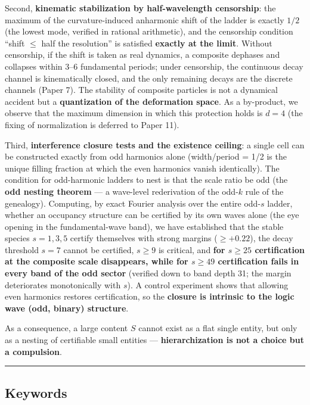 \documentclass[
]{article}
\begin{document}
Second, \textbf{kinematic stabilization by half-wavelength censorship}:
the maximum of the curvature-induced anharmonic shift of the ladder is
exactly \(1/2\) (the lowest mode, verified in rational arithmetic), and
the censorship condition ``shift \(\le\) half the resolution'' is satisfied
\textbf{exactly at the limit}. Without censorship, if the shift is taken
as real dynamics, a composite dephases and collapses within 3--6
fundamental periods; under censorship, the continuous decay channel is
kinematically closed, and the only remaining decays are the discrete
channels (Paper 7). The stability of composite particles is not a
dynamical accident but a \textbf{quantization of the deformation space}.
As a by-product, we observe that the maximum dimension in which this
protection holds is \(d=4\) (the fixing of normalization is deferred to
Paper 11).

Third, \textbf{interference closure tests and the existence ceiling}: a
single cell can be constructed exactly from odd harmonics alone
(width/period = 1/2 is the unique filling fraction at which the even
harmonics vanish identically). The condition for odd-harmonic ladders to
nest is that the scale ratio be odd (the \textbf{odd nesting theorem}
--- a wave-level rederivation of the odd-\(k\) rule of the genealogy).
Computing, by exact Fourier analysis over the entire odd-\(s\) ladder,
whether an occupancy structure can be certified by its own waves alone
(the eye opening in the fundamental-wave band), we have established that
the stable species \(s=1,3,5\) certify themselves with strong margins
(\(\ge+0.22\)), the decay threshold \(s=7\) cannot be certified,
\(s\ge9\) is critical, and \textbf{for \(s\ge25\) certification at the
composite scale disappears, while for \(s\ge49\) certification fails in
every band of the odd sector} (verified down to band depth 31; the
margin deteriorates monotonically with \(s\)). A control experiment
shows that allowing even harmonics restores certification, so the
\textbf{closure is intrinsic to the logic wave (odd, binary) structure}.

As a consequence, a large content \(S\) cannot exist as a flat single
entity, but only as a nesting of certifiable small entities ---
\textbf{hierarchization is not a choice but a compulsion}.

\begin{center}\rule{0.5\linewidth}{0.5pt}\end{center}

\subsection{Keywords}\label{keywords}
\end{document}
